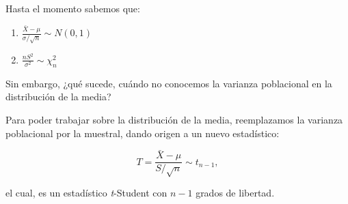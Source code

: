 \documentclass[
  11pt,
]{book}
\theoremstyle{definition}
\theoremstyle{definition}
\theoremstyle{definition}
\theoremstyle{definition}
\theoremstyle{remark}
\begin{document}
Hasta el momento sabemos que:

\begin{enumerate}
\def\labelenumi{\arabic{enumi}.}
\item
  \(\displaystyle\frac{\bar{X}-\mu}{\sigma/\sqrt{n}}\sim N(0,1)\)
\item
  \(\displaystyle\frac{nS^2}{\sigma^2}\sim \chi^2_{n}\)
\end{enumerate}

Sin embargo, ¿qué sucede, cuándo no conocemos la varianza poblacional en la distribución de la media?

Para poder trabajar sobre la distribución de la media, reemplazamos la varianza poblacional por la muestral, dando origen a un nuevo estadístico:

\begin{equation}
T = \frac{\bar{X}-\mu}{S/\sqrt{n}} \sim t_{n-1},
\label{eq:distMedia2}
\end{equation}

el cual, es un estadístico \emph{t}-Student con \(n-1\) grados de libertad.
\end{document}

